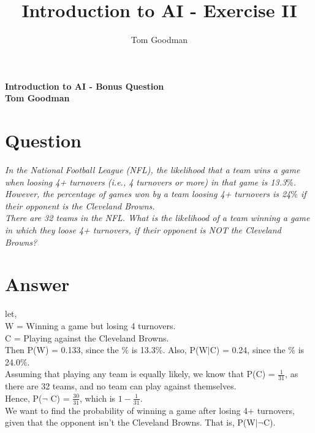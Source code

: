 \documentclass{article}
\title{Introduction to AI - Exercise II}
\author{Tom Goodman}
\date{}
\newcommand\ddfrac[2]{\frac{\displaystyle #1}{\displaystyle #2}}
\begin{document}
\begin{titlepage}
	\begin{flushleft}
		\vspace*{1cm}
		\Huge
		\textbf{Introduction to AI - Bonus Question} \\
		\vspace*{1cm}
		\Large
		\textbf{Tom Goodman} \\
	\end{flushleft}
\end{titlepage}
\newpage
\section{Question}
\textit{In the National Football League (NFL), the likelihood that a team wins a game
when loosing 4+ turnovers (i.e., 4 turnovers or more) in that game is 13.3$\%$.
However, the percentage of games won by a team loosing 4+ turnovers is 24$\%$ if
their opponent is the Cleveland Browns.}\\

\textit{There are 32 teams in the NFL. What is the likelihood of a team winning a game
in which they loose 4+ turnovers, if their opponent is NOT the Cleveland Browns?}\\
\section{Answer}
let, \\
\-\hspace{10mm} W = Winning a game but losing 4 turnovers. \\
\-\hspace{10mm} C = Playing against the Cleveland Browns. \\

Then P(W) = 0.133, since the $\%$ is 13.3$\%$. Also, P(W$|$C) = 0.24, since the $\%$ is 24.0$\%$. \\

Assuming that playing any team is equally likely, we know that P(C) = $\ddfrac{1}{31}$, as there are 32 teams, and no team can play against themselves. \\

Hence, P($\lnot$ C) = $\ddfrac{30}{31}$, which is $1 - \ddfrac{1}{31}$. \\

We want to find the probability of winning a game after losing 4+ turnovers, given that the opponent isn't the Cleveland Browns. That is, P(W$|\lnot$C).\\
\end{document}
